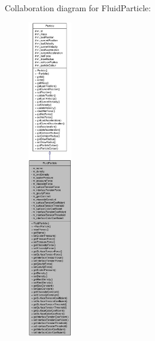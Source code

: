 Collaboration diagram for FluidParticle:\nopagebreak
\begin{figure}[H]
\begin{center}
\leavevmode
\includegraphics[height=400pt]{class_fluid_particle__coll__graph}
\end{center}
\end{figure}
